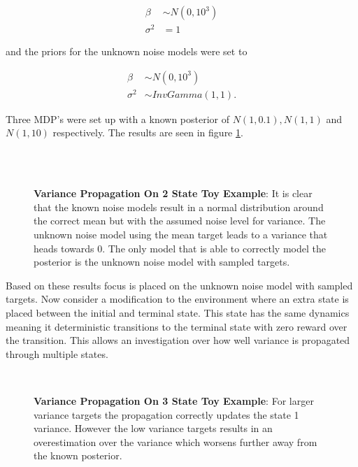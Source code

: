 \begin{align*}
    \beta &\sim N(0,10^3)\\
    \sigma^2 &= 1
\end{align*}

and the priors for the unknown noise models were set to

\begin{align*}
    \beta &\sim N(0,10^3) \\
    \sigma^2 &\sim InvGamma(1,1).
\end{align*}

Three MDP's were set up with a known posterior of $N(1, 0.1), N(1, 1)$ and $N(1, 10)$ respectively. The results are seen in figure \ref{fig:proptest}.

\begin{figure}[H]
    \centering
    \\
    \\
    \caption{\textbf{Variance Propagation On 2 State Toy Example}: It is clear that the known noise models result in a normal distribution around the correct mean but with the assumed noise level for variance. The unknown noise model using the mean target leads to a variance that heads towards 0. The only model that is able to correctly model the posterior is the unknown noise model with sampled targets.}
    \label{fig:proptest}
\end{figure}

Based on these results focus is placed on the unknown noise model with sampled targets. Now consider a modification to the environment where an extra state is placed between the initial and terminal state. This state has the same dynamics meaning it deterministic transitions to the terminal state with zero reward over the transition. This allows an investigation over how well variance is propagated through multiple states.

\begin{figure}[H]
    \centering

    \\
    \caption{\textbf{Variance Propagation On 3 State Toy Example}: For larger variance targets the propagation correctly updates the state 1 variance. However the low variance targets results in an overestimation over the variance which worsens further away from the known posterior.}
    \label{fig:3stateproptest}
\end{figure}

